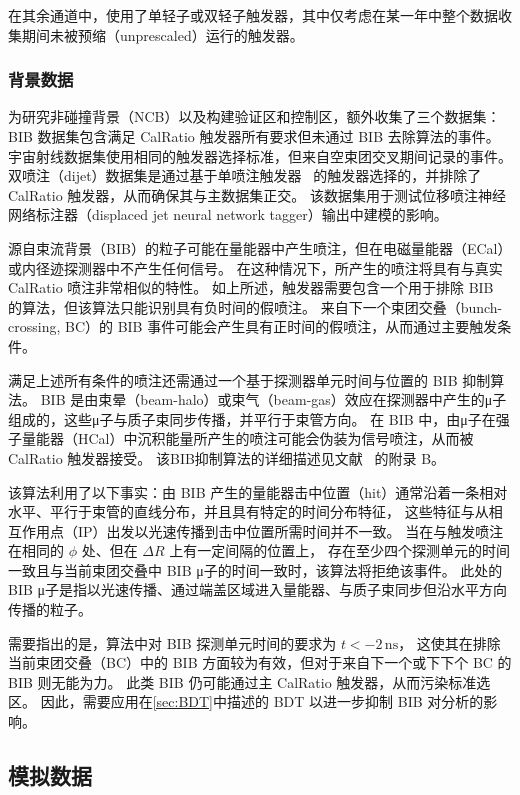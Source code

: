 在其余通道中，使用了单轻子或双轻子触发器，其中仅考虑在某一年中整个数据收集期间未被预缩（unprescaled）运行的触发器。


\subsubsection{背景数据}
为研究非碰撞背景（NCB）以及构建验证区和控制区，额外收集了三个数据集：
BIB 数据集包含满足 CalRatio 触发器所有要求但未通过 BIB 去除算法的事件。
宇宙射线数据集使用相同的触发器选择标准，但来自空束团交叉期间记录的事件。
双喷注（dijet）数据集是通过基于单喷注触发器~\cite{trigger} 的触发器选择的，并排除了 CalRatio 触发器，从而确保其与主数据集正交。
该数据集用于测试位移喷注神经网络标注器（displaced jet neural network tagger）输出中建模的影响。

源自束流背景（BIB）的粒子可能在量能器中产生喷注，但在电磁量能器（ECal）或内径迹探测器中不产生任何信号。
在这种情况下，所产生的喷注将具有与真实 CalRatio 喷注非常相似的特性。
如上所述，触发器需要包含一个用于排除 BIB 的算法，但该算法只能识别具有负时间的假喷注。
来自下一个束团交叠（bunch-crossing, BC）的 BIB 事件可能会产生具有正时间的假喷注，从而通过主要触发条件。

满足上述所有条件的喷注还需通过一个基于探测器单元时间与位置的 BIB 抑制算法。
BIB 是由束晕（beam-halo）或束气（beam-gas）效应在探测器中产生的μ子组成的，这些μ子与质子束同步传播，并平行于束管方向。
在 BIB 中，由μ子在强子量能器（HCal）中沉积能量所产生的喷注可能会伪装为信号喷注，从而被 CalRatio 触发器接受。
该BIB抑制算法的详细描述见文献~\cite{ATLAS-CONF-2016-103} 的附录 B。

该算法利用了以下事实：由 BIB 产生的量能器击中位置（hit）通常沿着一条相对水平、平行于束管的直线分布，并且具有特定的时间分布特征，
这些特征与从相互作用点（IP）出发以光速传播到击中位置所需时间并不一致。
当在与触发喷注在相同的 $\phi$ 处、但在 $\Delta R$ 上有一定间隔的位置上，
存在至少四个探测单元的时间一致且与当前束团交叠中 BIB μ子的时间一致时，该算法将拒绝该事件。
此处的 BIB μ子是指以光速传播、通过端盖区域进入量能器、与质子束同步但沿水平方向传播的粒子。

需要指出的是，算法中对 BIB 探测单元时间的要求为 $t < -2\,\mathrm{ns}$，
这使其在排除当前束团交叠（BC）中的 BIB 方面较为有效，但对于来自下一个或下下个 BC 的 BIB 则无能为力。
此类 BIB 仍可能通过主 CalRatio 触发器，从而污染标准选区。
因此，需要应用在\autoref{sec:BDT}中描述的 BDT 以进一步抑制 BIB 对分析的影响。


\subsection{模拟数据}
